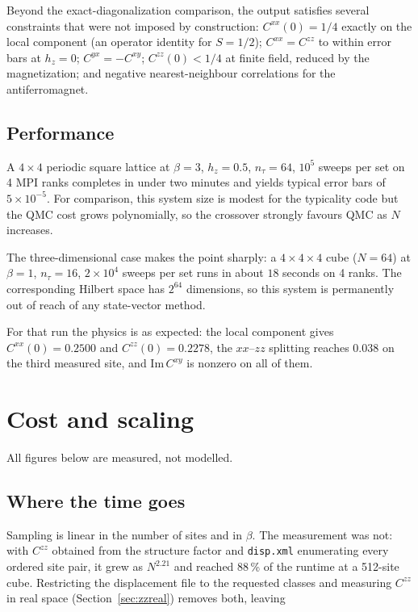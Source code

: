 \documentclass[11pt,a4paper]{article}
\newcommand{\code}[1]{\texttt{#1}}
\begin{document}
Beyond the exact-diagonalization comparison, the output satisfies several
constraints that were not imposed by construction:
$C^{xx}(0)=1/4$ exactly on the local component (an operator identity for
$S=1/2$); $C^{xx}=C^{zz}$ to within error bars at $h_z=0$; $C^{yx}=-C^{xy}$;
$C^{zz}(0)<1/4$ at finite field, reduced by the magnetization; and negative
nearest-neighbour correlations for the antiferromagnet.

\subsection{Performance}

A $4\times4$ periodic square lattice at $\beta=3$, $h_z=0.5$, $n_\tau=64$,
$10^5$ sweeps per set on 4 MPI ranks completes in under two minutes and yields
typical error bars of $5\times10^{-5}$. For comparison, this system size is
modest for the typicality code but the QMC cost grows polynomially, so the
crossover strongly favours QMC as $N$ increases.

The three-dimensional case makes the point sharply: a $4\times4\times4$ cube
($N=64$) at $\beta=1$, $n_\tau=16$, $2\times10^4$ sweeps per set runs in about
$18$ seconds on 4 ranks. The corresponding Hilbert space has $2^{64}$
dimensions, so this system is permanently out of reach of any state-vector
method.

For that run the physics is as expected: the local component gives
$C^{xx}(0)=0.2500$ and $C^{zz}(0)=0.2278$, the $xx$--$zz$ splitting reaches
$0.038$ on the third measured site, and $\mathrm{Im}\,C^{xy}$ is nonzero on all
of them.

\section{Cost and scaling}
\label{sec:cost}

All figures below are measured, not modelled.

\subsection{Where the time goes}

Sampling is linear in the number of sites and in $\beta$. The measurement was
not: with $C^{zz}$ obtained from the structure factor and \code{disp.xml}
enumerating every ordered site pair, it grew as $N^{2.21}$ and reached 88\,\% of
the runtime at a 512-site cube. Restricting the displacement file to the
requested classes and measuring $C^{zz}$ in real space
(Section~\ref{sec:zzreal}) removes both, leaving
\end{document}
